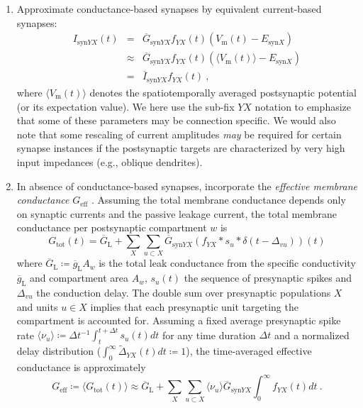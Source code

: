 \begin{enumerate}
\item Approximate conductance-based synapses by equivalent current-based synapses:
\begin{eqnarray}
I_{\text{syn}YX}(t)
	&=& \overline{G}_{\text{syn}YX}f_{YX}(t)\left(V_\text{m}(t) - E_{\text{syn}X}\right) \\
	&\approx& \overline{G}_{\text{syn}YX}f_{YX}(t)\left(\langle V_\text{m}(t) \rangle - E_{\text{syn}X}\right) \\
	&=& \overline{I}_{\text{syn}YX}f_{YX}(t)~,
\end{eqnarray}
where $\langle V_\text{m}(t) \rangle$ denotes the spatiotemporally averaged postsynaptic potential (or its expectation value).
We here use the sub-fix $YX$ notation to emphasize that some of these parameters may be connection specific.
We would also note that some rescaling of current amplitudes \emph{may} be required for certain synapse instances if the postsynaptic targets are characterized by very high input impedances (e.g., oblique dendrites).

\item In absence of conductance-based synapses, incorporate the \emph{effective membrane conductance} $G_\text{eff}$ 
.
Assuming the total membrane conductance depends only on synaptic currents and the passive leakage current,
the total membrane conductance per postsynaptic compartment $w$ is
\begin{equation}
G_{\text{tot}}(t) = \overline{G}_\text{L} + \sum_X \sum_{u \subset X} \overline{G}_{\text{syn}YX} \left( f_{YX} \ast s_u \ast \delta(t-\Delta_{vu}) \right)(t)
\end{equation}
where $\overline{G}_\text{L} \coloneq \overline{g}_\text{L} A_w$ is the total leak conductance from the specific conductivity $\overline{g}_\text{L}$ and compartment area $A_w$, 
$s_u(t)$ the sequence of presynaptic spikes and $\Delta_{vu}$ the conduction delay. 
The double sum over presynaptic populations $X$ and units $u \in X$ implies that each presynaptic unit targeting the compartment is accounted for. 
Assuming a fixed average presynaptic spike rate $\langle \nu_u \rangle \coloneq \Delta t^{-1} \int_t^{t+\Delta t} s_u(t) dt$ for any time duration $\Delta t$ and a normalized delay distribution ($\int_0^\infty \widetilde{\Delta}_{YX}(t) dt \coloneq 1$), 
the time-averaged effective conductance is approximately
\begin{equation}
G_\text{eff} \coloneq \langle G_\text{tot}(t) \rangle \approx \overline{G}_\text{L} + \sum_X \sum_{u \subset X} \langle \nu_u \rangle \overline{G}_{\text{syn}YX} \int_0^\infty f_{YX}(t) dt ~.
\end{equation}


\end{enumerate}
